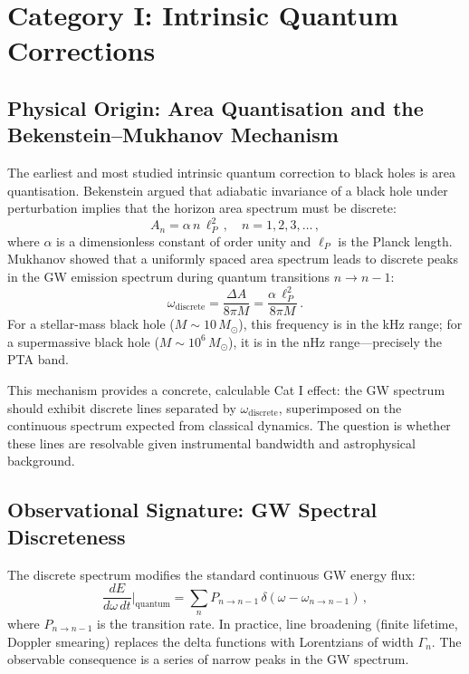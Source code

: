 \documentclass[11pt]{article}
\begin{document}
\section{Category I: Intrinsic Quantum Corrections}\label{sec:cat1}

\subsection{Physical Origin: Area Quantisation and the Bekenstein--Mukhanov Mechanism}

The earliest and most studied intrinsic quantum correction to black holes is area quantisation. Bekenstein \cite{Bekenstein:1994} argued that adiabatic invariance of a black hole under perturbation implies that the horizon area spectrum must be discrete:
\begin{equation}
A_n = \alpha \, n \, \ell_P^2\,,\quad n = 1, 2, 3, \dots\,,
\end{equation}
where $\alpha$ is a dimensionless constant of order unity and $\ell_P$ is the Planck length. Mukhanov \cite{Mukhanov:1996} showed that a uniformly spaced area spectrum leads to discrete peaks in the GW emission spectrum during quantum transitions $n \to n-1$:
\begin{equation}
\omega_{\mathrm{discrete}} = \frac{\Delta A}{8\pi M} = \frac{\alpha \, \ell_P^2}{8\pi M}\,.
\end{equation}
For a stellar-mass black hole ($M \sim 10\,M_\odot$), this frequency is in the kHz range; for a supermassive black hole ($M \sim 10^6\,M_\odot$), it is in the nHz range---precisely the PTA band.

This mechanism provides a concrete, calculable Cat I effect: the GW spectrum should exhibit discrete lines separated by $\omega_{\mathrm{discrete}}$, superimposed on the continuous spectrum expected from classical dynamics. The question is whether these lines are resolvable given instrumental bandwidth and astrophysical background.

\subsection{Observational Signature: GW Spectral Discreteness}

The discrete spectrum modifies the standard continuous GW energy flux:
\begin{equation}
\frac{dE}{d\omega\,dt}\Big|_{\mathrm{quantum}} = \sum_{n} P_{n \to n-1} \, \delta(\omega - \omega_{n \to n-1})\,,
\end{equation}
where $P_{n \to n-1}$ is the transition rate. In practice, line broadening (finite lifetime, Doppler smearing) replaces the delta functions with Lorentzians of width $\Gamma_n$. The observable consequence is a series of narrow peaks in the GW spectrum.
\end{document}
